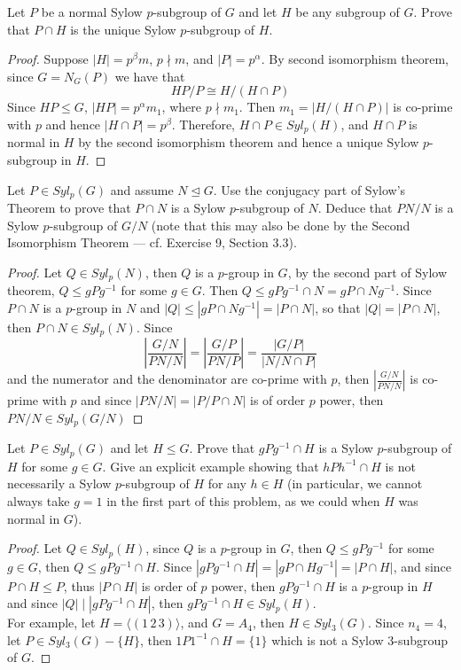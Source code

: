 \documentclass{article}
\newenvironment{problem}[2][Problem]{\begin{trivlist}
\item[\hskip \labelsep {\bfseries #1}\hskip \labelsep {\bfseries #2.}]}{\end{trivlist}}
\begin{document}
\begin{problem}{33}
     Let $P$ be a normal Sylow $p$-subgroup of $G$ and let $H$ be any subgroup of $G$. Prove that $P \cap H$ is the unique Sylow $p$-subgroup of $H$.
\end{problem}
\begin{proof}
    Suppose $|H|=p^{\beta}m$, $p \nmid m$, and $|P|=p^{\alpha}$. By second isomorphism theorem, since $G=N_G(P)$ we have that 
    \[
        HP/P\cong H/(H\cap P)
    \]
    Since $HP\leq G$, $|HP|=p^{\alpha}m_1$, where $p \nmid m_1$. Then $m_1 = |H/(H\cap P)|$ is co-prime with $p$ and hence $|H\cap P|=p^{\beta}$. Therefore, $H\cap P\in Syl_p(H)$, and $H\cap P$ is normal in $H$ by the second isomorphism theorem and hence a unique Sylow $p$-subgroup in $H$. 
\end{proof}
\begin{problem}{34}
        Let $P \in Syl_p(G)$ and assume $N \trianglelefteq G$. Use the conjugacy part of Sylow’s Theorem to prove that $P \cap N$ is a Sylow $p$-subgroup of $N$. Deduce that $PN/N$ is a Sylow $p$-subgroup of $G/N$ (note that this may also be done by the Second Isomorphism Theorem — cf. Exercise 9, Section 3.3).
\end{problem}
\begin{proof}
    Let $Q\in Syl_p(N)$, then $Q$ is a $p$-group in $G$, by the second part of Sylow theorem, $Q\leq gPg^{-1}$ for some $g\in G$. Then $Q\leq gPg^{-1}\cap N = gP\cap Ng^{-1}$. Since $P\cap N$ is a $p$-group in $N$ and $|Q|\leq |gP\cap Ng^{-1}|=|P\cap N|$, so that $|Q|=|P\cap N|$, then $P\cap N\in Syl_p(N)$.  Since \[         |\frac{G/N}{PN/N}|=|\frac{G/P}{PN/P}|=\frac{|G/ P|}{|N/N\cap P|}     \] and the numerator and the denominator are co-prime with $p$, then $|\frac{G/N}{PN/N}|$ is co-prime with $p$ and since $|PN/N|=|P/P\cap N|$ is of order $p$ power, then $PN/N\in Syl_p(G/N)$
\end{proof}
\begin{problem}{35}
        Let $P \in Syl_p(G)$ and let $H \leq G$. Prove that $gPg^{-1} \cap H$ is a Sylow $p$-subgroup of $H$ for some $g \in G$. Give an explicit example showing that $hPh^{-1} \cap H$ is not necessarily a Sylow $p$-subgroup of $H$ for any $h \in H$ (in particular, we cannot always take $g = 1$ in the first part of this problem, as we could when $H$ was normal in $G$).
\end{problem}
\begin{proof}
    Let $Q\in Syl_p(H)$, since $Q$ is a $p$-group in $G$, then $Q\leq gPg^{-1}$ for some $g\in G$, then $Q\leq gPg^{-1}\cap H$. Since $|gPg^{-1}\cap H|=|gP\cap Hg^{-1}|=|P\cap H|$, and since $P\cap H\leq P$, thus $|P\cap H|$ is order of $p$ power, then $gPg^{-1}\cap H$ is a $p$-group in $H$ and since $|Q|\mid |gPg^{-1}\cap H| $, then $gPg^{-1}\cap H\in Syl_p(H)$.\\
    For example, let $H=\langle (1\, 2\, 3)\rangle$, and $G=A_4$, then $H\in Syl_3(G)$. Since $n_4 =4$, let $P\in Syl_3(G)-\{H\}$, then $1P1^{-1}\cap H = \{1\}$ which is not a Sylow 3-subgroup of $G$.  
\end{proof}
\end{document}

